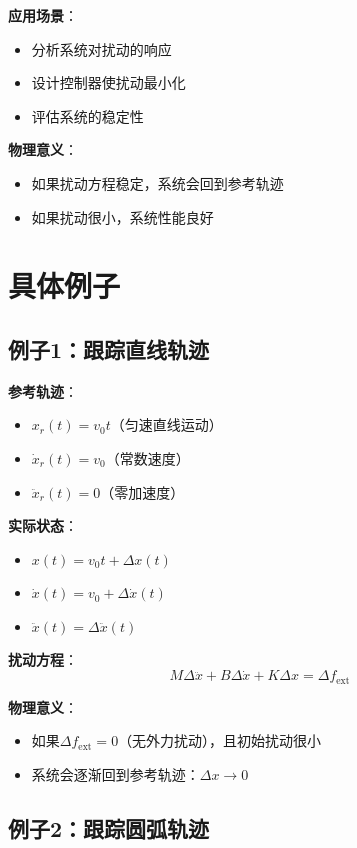 \documentclass[12pt,a4paper]{article}
\begin{document}
\textbf{应用场景}：
\begin{itemize}
\item 分析系统对扰动的响应
\item 设计控制器使扰动最小化
\item 评估系统的稳定性
\end{itemize}

\textbf{物理意义}：
\begin{itemize}
\item 如果扰动方程稳定，系统会回到参考轨迹
\item 如果扰动很小，系统性能良好
\end{itemize}

\section{具体例子}

\subsection{例子1：跟踪直线轨迹}

\textbf{参考轨迹}：
\begin{itemize}
\item $x_r(t) = v_0 t$（匀速直线运动）
\item $\dot{x}_r(t) = v_0$（常数速度）
\item $\ddot{x}_r(t) = 0$（零加速度）
\end{itemize}

\textbf{实际状态}：
\begin{itemize}
\item $x(t) = v_0 t + \Delta x(t)$
\item $\dot{x}(t) = v_0 + \Delta \dot{x}(t)$
\item $\ddot{x}(t) = \Delta \ddot{x}(t)$
\end{itemize}

\textbf{扰动方程}：
\begin{equation}
M\Delta \ddot{x} + B\Delta \dot{x} + K\Delta x = \Delta f_{\text{ext}}
\end{equation}

\textbf{物理意义}：
\begin{itemize}
\item 如果$\Delta f_{\text{ext}} = 0$（无外力扰动），且初始扰动很小
\item 系统会逐渐回到参考轨迹：$\Delta x \to 0$
\end{itemize}

\subsection{例子2：跟踪圆弧轨迹}
\end{document}
